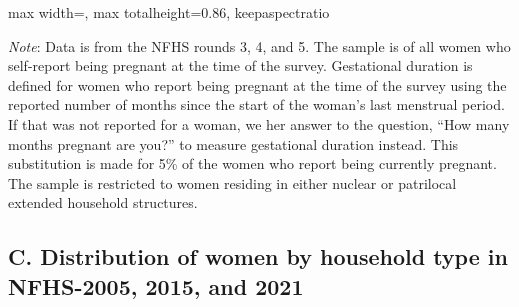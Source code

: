 \documentclass[10pt,twoside,reqno]{article}
\begin{document}
\begin{table}[H]
\sansmath
\sffamily
\captionsetup{style=CAPTAB}
\caption{\hspace{-.99em}: Predicting early pregnancy}
\label{tab:earlypregnancy}
\vspace{-8pt}

\begin{center}
\begin{scriptsize}
\setlength{\tabcolsep}{3pt}
\renewcommand{\arraystretch}{0.9}
\begin{adjustbox}{max width=\textwidth, max totalheight=0.86\textheight, keepaspectratio}

\end{adjustbox}
\end{scriptsize}
\end{center}

\vspace{0.5ex}
\small\scriptsize{\textsf{\textit{Note}: Data is from the NFHS rounds 3, 4, and 5.}}
\newline\small\scriptsize{\textsf{The sample is of all women who self-report being pregnant at the time of the survey.}}
\newline\small\scriptsize{\textsf{Gestational duration is defined for women who report being pregnant at the time of the survey using the reported number of months since the start of the woman's last menstrual period. If that was not reported for a woman, we her answer to the question, ``How many months pregnant are you?'' to measure gestational duration instead. This substitution is made for 5\% of the women who report being currently pregnant.}}
\newline\small\scriptsize{\textsf{The sample is restricted to women residing in either nuclear or patrilocal extended household structures.}}

\end{table}

\clearpage
\renewcommand{\thesection}{C-\arabic{section}}
\setcounter{equation}{0}
\renewcommand{\theequation}{C-\arabic{equation}}
\setcounter{figure}{0}
\renewcommand{\thefigure}{C-\arabic{figure}}
\setcounter{table}{0}
\renewcommand{\thetable}{C-\arabic{table}}

\subsection*{C. Distribution of women by household type in NFHS-2005, 2015, and 2021}
\end{document}
